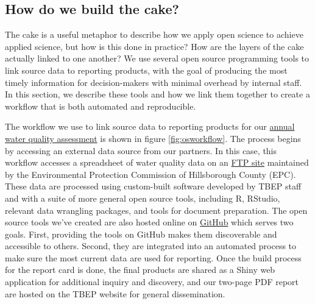 \documentclass[
]{book}
\begin{document}
\subsection{How do we build the cake?}\label{automation}

The cake is a useful metaphor to describe how we apply open science to achieve applied science, but how is this done in practice? How are the layers of the cake actually linked to one another? We use several open source programming tools to link source data to reporting products, with the goal of producing the most timely information for decision-makers with minimal overhead by internal staff. In this section, we describe these tools and how we link them together to create a workflow that is both automated and reproducible.

The workflow we use to link source data to reporting products for our \href{https://tbep.org/water-quality-report-card/}{annual water quality assessment} is shown in figure \ref{fig:osworkflow}. The process begins by accessing an external data source from our partners. In this case, this workflow accesses a spreadsheet of water quality data on an \href{ftp://ftp.epchc.org/EPC_ERM_FTP/WQM_Reports/}{FTP site} maintained by the Environmental Protection Commission of Hillsborough County (EPC). These data are processed using custom-built software developed by TBEP staff and with a suite of more general open source tools, including R, RStudio, relevant data wrangling packages, and tools for document preparation. The open source tools we've created are also hosted online on \href{https://github.com/tbep-tech}{GitHub} which serves two goals. First, providing the tools on GitHub makes them discoverable and accessible to others. Second, they are integrated into an automated process to make sure the most current data are used for reporting. Once the build process for the report card is done, the final products are shared as a Shiny web application for additional inquiry and discovery, and our two-page PDF report are hosted on the TBEP website for general dissemination.
\end{document}

